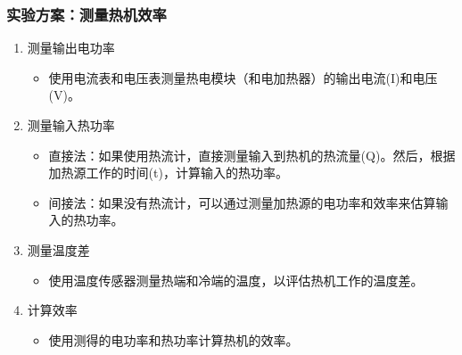 \documentclass[aspectratio=169]{beamer}
\begin{document}
	\begin{frame}
		\frametitle{实验方案：测量热机效率}
		
		\begin{enumerate}
			\item 测量输出电功率
			\begin{itemize}
				\item 使用电流表和电压表测量热电模块（和电加热器）的输出电流(I)和电压(V)。 
			\end{itemize}
			
			\item 测量输入热功率
			\begin{itemize}
				\item 直接法：如果使用热流计，直接测量输入到热机的热流量(Q)。然后，根据加热源工作的时间(t)，计算输入的热功率。
				\item 间接法：如果没有热流计，\textcolor{c4}{可以通过测量加热源的电功率和效率来估算输入的热功率}。
			\end{itemize}
			
			\item \textcolor{c4}{测量温度差}
			\begin{itemize}
				\item 使用温度传感器测量热端和冷端的温度，以评估热机工作的温度差。
			\end{itemize}
			
			\item 计算效率
			\begin{itemize}
				\item 使用测得的电功率和热功率计算热机的效率。
			\end{itemize}
		\end{enumerate}
	\end{frame}
	
\end{document}
